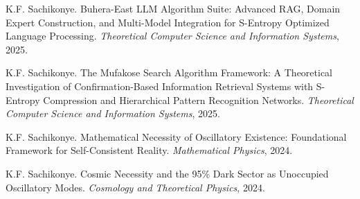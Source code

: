 \documentclass[12pt,a4paper]{article}
\begin{document}
\begin{thebibliography}{99}
K.F. Sachikonye.
\newblock Buhera-East LLM Algorithm Suite: Advanced RAG, Domain Expert Construction, and Multi-Model Integration for S-Entropy Optimized Language Processing.
\newblock \textit{Theoretical Computer Science and Information Systems}, 2025.

K.F. Sachikonye.
\newblock The Mufakose Search Algorithm Framework: A Theoretical Investigation of Confirmation-Based Information Retrieval Systems with S-Entropy Compression and Hierarchical Pattern Recognition Networks.
\newblock \textit{Theoretical Computer Science and Information Systems}, 2025.

K.F. Sachikonye.
\newblock Mathematical Necessity of Oscillatory Existence: Foundational Framework for Self-Consistent Reality.
\newblock \textit{Mathematical Physics}, 2024.

K.F. Sachikonye.
\newblock Cosmic Necessity and the 95\% Dark Sector as Unoccupied Oscillatory Modes.
\newblock \textit{Cosmology and Theoretical Physics}, 2024.

\end{thebibliography}
\end{document}
